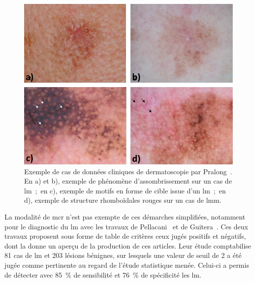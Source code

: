 \begin{figure}[H]
    \begin{center}
        \includegraphics[width=\linewidth]{contents/chapter_4/resources/example_dermoscopy_pattern.pdf}
        \caption{Exemple de cas de données cliniques de dermatoscopie par Pralong~. En a) et b), exemple de phénomène d'assombrissement sur un cas de \gls{lm}~;~en c), exemple de motifs en forme de cible issue d'un \gls{lm}~;~en d), exemple de structure rhomboïdales rouges sur un cas de \gls{lmm}.}
        \label{fig:example_dermoscopy_pattern}
    \end{center} 
\end{figure}\par

La modalité de \gls{mcr} n'est pas exempte de ces démarches simplifiées, notamment pour le diagnostic du \gls{lm} avec les travaux de Pellacani~ et de Guitera~. Ces deux travaux proposent sous forme de table de critères ceux jugés positifs et négatifs, dont la  donne un aperçu de la production de ces articles. Leur étude comptabilise 81 cas de \gls{lm} et 203 lésions bénignes, sur lesquels une valeur de seuil de 2 a été jugée comme pertinente au regard de l'étude statistique menée. Celui-ci a permis de détecter avec 85~\% de sensibilité et 76~\% de spécificité les \gls{lm}.\par

